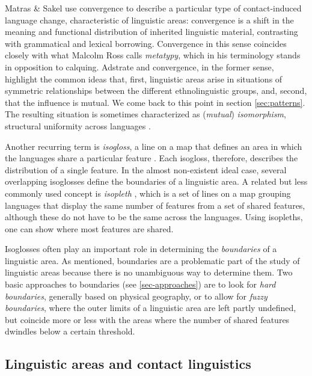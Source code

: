 \documentclass[output=paper,
modfonts
]{langscibook}
\begin{document}
Matras \& Sakel \parencite*{matras&sakel2007} use convergence to describe a particular type of contact-induced language change, characteristic of linguistic areas: convergence is a shift in the meaning and functional distribution of inherited linguistic material, contrasting with grammatical and lexical borrowing. Convergence in this sense coincides closely with what Malcolm Ross \parencite*{ross2007} calls \textit{metatypy}, which in his terminology stands in opposition to calquing. Adstrate and convergence, in the former sense, highlight the common ideas that, first, linguistic areas arise in situations of symmetric relationships between the different ethnolinguistic groups, and, second, that the influence is mutual. We come back to this point in section \ref{sec:patterns}. The resulting situation is sometimes characterized as (\textit{mutual}) \textit{isomorphism}, structural uniformity across languages \parencite[see][]{matras1998}.

Another recurring term is \textit{isogloss}, a line on a map that defines an area in which the languages share a particular feature \parencite[or, more rarely, in the case of exclusively structural features; \textit{isogrammatism} is also used, see][]{gołąb1956}. Each isogloss, therefore, describes the distribution of a single feature. In the almost non-existent ideal  case, several overlapping isoglosses define the boundaries of a linguistic area. A related but less commonly used concept is \textit{isopleth} \parencite[see][]{auwera1998}, which is a set of lines on a map grouping languages that display the same number of features from a set of shared features, although these do not have to be the same across the languages. Using isopleths, one can show where most features are shared.

Isoglosses often play an important role in determining the \textit{boundaries} of a linguistic area. As mentioned, boundaries are a problematic part of the study of linguistic areas because there is no unambiguous way to determine them. Two basic approaches to boundaries (see \ref{sec-approaches}) are to look for \textit{hard boundaries}, generally based on physical geography, or to allow for \textit{fuzzy boundaries}, where the outer limits of a linguistic area are left partly undefined, but coincide more or less with the areas where the number of shared features dwindles below a certain threshold.

\subsection{Linguistic areas and contact linguistics} \label{subsec:linguistic areas and contact linguistics}
\end{document}
